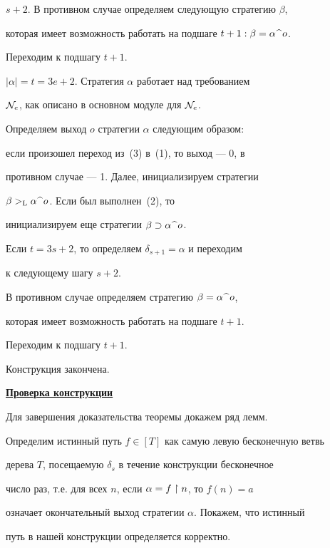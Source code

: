 $s+2$. В противном случае определяем следующую стратегию $\beta$,


которая имеет возможность работать на подшаге $t+1:\beta=\alpha\,\widehat{\ }\,o$.


Переходим к подшагу $t+1$.


 


$|\alpha|=t=3e+2$. Стратегия $\alpha$ работает над требованием


${\cal N}_e$, как описано в основном модуле для ${\cal N}_e$.


Определяем выход $o$ стратегии $\alpha$ следующим образом:


если произошел переход из~(3) в~(1), то выход --- 0, в


противном случае --- 1. Далее, инициализируем стратегии


$\beta>_{\mathrm L}\alpha\,\widehat{\ }\,o$. Если был выполнен~(2), то


инициализируем еще стратегии $\beta\supset\alpha\,\widehat{\ }\,o$.


Если $t=3s+2$, то определяем $\delta_{s+1}=\alpha$ и переходим


к следующему шагу $s+2$.


В противном случае определяем стратегию $\beta=\alpha\,\widehat{\ }\,o$,


которая имеет возможность работать на подшаге $t+1$.


Переходим к подшагу $t+1$.


Конструкция закончена.





\bigskip


\underline{\bf Проверка конструкции}


\medskip


 


Для завершения доказательства теоремы докажем ряд лемм.


 


Определим истинный путь $f\in [T]$ как самую левую бесконечную ветвь


дерева $T$, посещаемую $\delta_s$ в течение конструкции бесконечное 


число раз, т.е. для всех $n$, если $\alpha=f\restriction n$, то $f(n)=a$


означает окончательный выход стратегии $\alpha$. Покажем, что истинный 


путь в нашей конструкции определяется корректно. 





